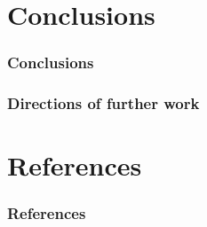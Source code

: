 \documentclass{beamer}
\begin{document}
\section{Conclusions}

\begin{frame}
  \frametitle{Conclusions}
\end{frame}

\begin{frame}
  \frametitle{Directions of further work}
\end{frame}

\section*{References}

\begin{frame}[allowframebreaks]
  \frametitle{References}

  
  
\end{frame}
\end{document}
